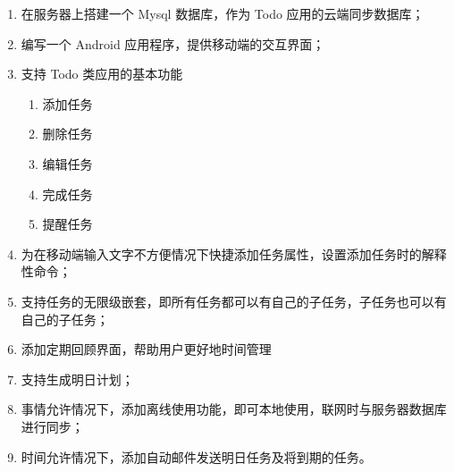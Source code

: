 \begin{enumerate}
    \item 在服务器上搭建一个 Mysql 数据库，作为 Todo 应用的云端同步数据库；
    \item 编写一个 Android 应用程序，提供移动端的交互界面；
    \item 支持 Todo 类应用的基本功能
        \begin{enumerate}
            \item 添加任务
            \item 删除任务
            \item 编辑任务
            \item 完成任务
            \item 提醒任务
        \end{enumerate}
    \item 为在移动端输入文字不方便情况下快捷添加任务属性，设置添加任务时的解释性命令；
    \item 支持任务的无限级嵌套，即所有任务都可以有自己的子任务，子任务也可以有自己的子任务；
    \item 添加定期回顾界面，帮助用户更好地时间管理
    \item 支持生成明日计划；
    \item 事情允许情况下，添加离线使用功能，即可本地使用，联网时与服务器数据库进行同步；
    \item 时间允许情况下，添加自动邮件发送明日任务及将到期的任务。
\end{enumerate}
